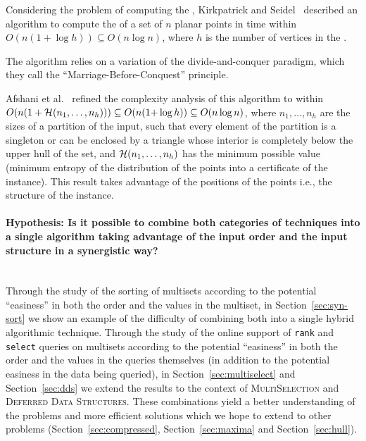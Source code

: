 Considering the problem of computing the {}, Kirkpatrick and Seidel~\cite{1986-JCom-TheUltimatePlanarConvexHullAlgorithm-KirkpatrickSeidel} described an algorithm to compute the {} of a set of $n$ planar points in time within $O(n(1+\log h))\subseteq O(n\log n)$, where $h$ is the number of vertices in the {}.
\begin{INUTILE}
  The algorithm relies on a variation of the divide-and-conquer
  paradigm, which they call the ``Marriage-Before-Conquest''
  principle.
\end{INUTILE}
Afshani et al.~\cite{2009-FOCS-InstanceOptimalGeometricAlgorithms-AfshaniBarbayChan} refined the complexity analysis of this algorithm to within $O(n(1+{\cal H}(n_1,\ldots,n_h)))\subseteq O(n(1{+}\log h)) \subseteq O(n\log{n})$, where $n_1, \dots, n_h$ are the sizes of a partition of the input, such that every element of the partition is a singleton or can be enclosed by a triangle whose interior is completely below the upper hull of the set, and ${\cal H}(n_1,\ldots,n_h)$ has the minimum possible value (minimum entropy of the distribution of the points into a certificate of the instance). This result takes advantage of the positions of the points i.e., the structure of the instance.


\paragraph{Hypothesis: Is it possible to combine both categories of
techniques into a single algorithm taking advantage of the input order
and the input structure in a synergistic way?}~\\


Through the study of the sorting of multisets according to the
potential ``easiness'' in both the order and the values in the
multiset, in Section~\ref{sec:syn-sort} we show an
example of the difficulty of combining both into a single hybrid
algorithmic technique.
%
Through the study of the online support of \texttt{rank} and
\texttt{select} queries on multisets according to the potential
``easiness'' in both the order and the values in the queries
themselves (in addition to the potential easiness in the data being
queried), in Section~\ref{sec:multiselect} and Section~\ref{sec:dds}
we extend the results to the context of \textsc{MultiSelection} and
\textsc{Deferred Data Structures}. These combinations yield a better
understanding of the problems and more efficient solutions which we
hope to extend to other problems (Section~\ref{sec:compressed},
Section~\ref{sec:maxima} and Section~\ref{sec:hull}).



